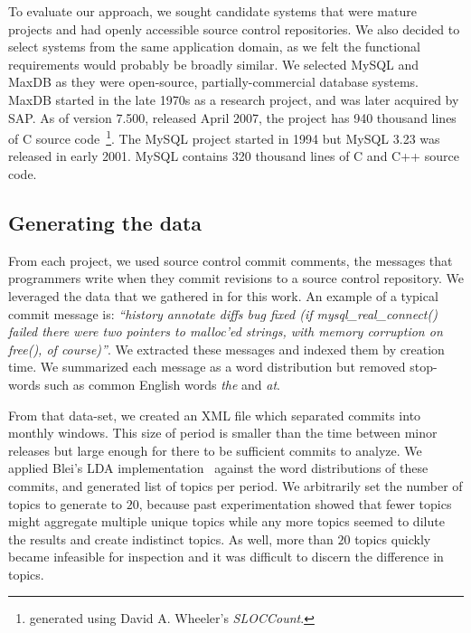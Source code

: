 \documentclass{acm_proc_article-sp}
\begin{document}
To evaluate our approach, we sought candidate systems that were
mature projects and had openly accessible source control repositories.
We also decided to select systems from the same application
domain, as we felt the functional requirements would probably be
broadly similar.
We selected MySQL and MaxDB as they were open-source, partially-commercial database systems. MaxDB started in the late 1970s as a research project, and was later acquired by SAP. As of version 7.500, released April 2007, the project has 940 thousand lines of C source code~\footnote{generated using David A. Wheeler's \emph{SLOCCount}.}.
The MySQL project started in 1994 but MySQL 3.23 was released in early 2001. MySQL contains 320 thousand lines of C and C++ source code. 

\subsection{Generating the data}
From each project, we used source control commit comments, the messages that programmers write when they commit revisions to a source control repository. We leveraged the data that we gathered in \cite{Hindle09ICSM} for this work. An example of a typical commit message is: \textit{``history annotate diffs bug fixed (if mysql\_real\_connect() failed there were two pointers to malloc'ed strings, with memory corruption on free(), of course)''}. We extracted these messages and indexed them by creation time. We summarized each message as a word distribution but removed stop-words such as common English words \emph{the} and \emph{at}.

From that data-set, we created an XML file which separated commits into
monthly windows. This size of period is smaller than the time between minor releases but large enough for there to be sufficient commits to analyze. We applied Blei's LDA implementation~\cite{Blei2003} against the word distributions of these commits, and generated list of topics per period. 
We arbitrarily set the number of topics to generate to $20$, because past experimentation showed that fewer topics might aggregate multiple unique topics while any more topics seemed to dilute the results and create indistinct topics. As well, more than $20$ topics quickly became infeasible for inspection and it was difficult to discern the difference in topics.
\end{document}
